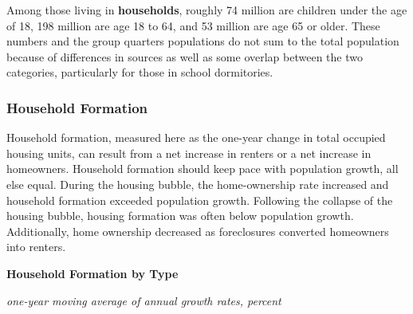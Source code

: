 \documentclass{report}
\makeatletter
\newcommand*\short[1]{\expandafter\@gobbletwo\number\numexpr#1\relax}
\newcommand{\sbar}[4]{
		\addplot[ybar stacked, bar width=2.6pt, draw opacity=0, fill=#1] 
			table [x=#2, y=#3, col sep=comma]{#4};}
\newcommand{\stdnode}[3]{\node[below, align=left, shift=({#1,#2})]{#3};}
\newcommand{\dateaxisticks}{
		date coordinates in=x, axis line style={draw=none},
		xmax={2020-08-10},
		max space between ticks=40,	    
		xtick={{1990-01-01}, {1992-01-01}, {1994-01-01}, 
			{1996-01-01}, {1998-01-01}, {2000-01-01}, 
			{2002-01-01}, {2004-01-01}, {2006-01-01},
			{2008-01-01}, {2010-01-01}, {2012-01-01}, {2014-01-01},
		    {2016-01-01}, {2018-01-01}, {2020-01-01}},
		minor xtick={{1989-01-01}, {1991-01-01}, {1993-01-01},
			{1995-01-01}, {1997-01-01}, {1999-01-01}, 
			{2001-01-01}, {2003-01-01}, {2005-01-01}, {2007-01-01},
		    {2009-01-01}, {2011-01-01}, {2013-01-01}, {2015-01-01},
		    {2017-01-01}, {2019-01-01}},
		enlarge y limits={0.06}, enlarge x limits={0.01},
		}
\newcommand{\bbar}[2]{extra #1 ticks = {{#2}}, extra #1 tick labels = ,
		extra #1 tick style = {grid=major, grid style={thick, black!25}},}
\newcommand{\stdline}[4]{\addplot[very thick, no markers, color=#1] 
		table [x=#2, y=#3, col sep=comma] {#4};	}
\newcommand{\rbars}{
		\fill[color=black!10] (axis cs:{1990-07-01},\pgfkeysvalueof{/pgfplots/ymin}) rectangle 
			(axis cs:{1991-03-01}, \pgfkeysvalueof{/pgfplots/ymax});
		\fill[color=black!10] (axis cs:{2007-12-01},\pgfkeysvalueof{/pgfplots/ymin}) rectangle 
			(axis cs:{2009-07-01}, \pgfkeysvalueof{/pgfplots/ymax});
		\fill[color=black!10] (axis cs:{2001-03-01},\pgfkeysvalueof{/pgfplots/ymin}) rectangle 
			(axis cs:{2001-11-01}, \pgfkeysvalueof{/pgfplots/ymax});
		\fill[color=black!10] (axis cs:{2020-02-01},\pgfkeysvalueof{/pgfplots/ymin}) rectangle 
			(axis cs:{2020-09-01}, \pgfkeysvalueof{/pgfplots/ymax});}
\makeatother
\begin{document}
{{{\begin{minipage}{0.76\textwidth}
Among those living in \textbf{households}, roughly 74 million are children under the age of 18, 198 million are age 18 to 64, and 53 million are age 65 or older. These numbers and the group quarters populations do not sum to the total population because of differences in sources as well as some overlap between the two categories, particularly for those in school dormitories. \\

\end{minipage}

\newpage

\subsubsection*{\color{black!70} \seriffont Household Formation}

\begin{minipage}{0.76\textwidth}

\small Household formation, measured here as the one-year change in total occupied housing units, can result from a net increase in renters or a net increase in homeowners. Household formation should keep pace with population growth, all else equal. During the housing bubble, the home-ownership rate increased and household formation exceeded population growth. Following the collapse of the housing bubble, housing formation was often below population growth. Additionally, home ownership decreased as foreclosures converted homeowners into renters. \\



\vspace{4mm}

\normalsize \textbf{Household Formation by Type}

\footnotesize{\textit{one-year moving average of annual growth rates, percent}}

\hspace*{-2mm} 


\end{minipage}}}}
\end{document}
